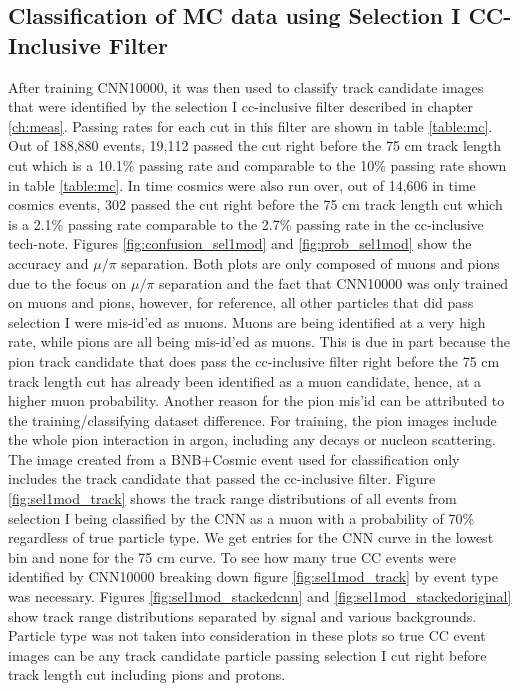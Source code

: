 \subsection{Classification of MC data using Selection I CC-Inclusive Filter}

After training CNN10000, it was then used to classify track candidate images that were identified by the selection I cc-inclusive filter described in chapter \ref{ch:meas}. Passing rates for each cut in this filter are shown in table \ref{table:mc}. Out of 188,880 events, 19,112 passed the cut right before the 75 cm track length cut which is a 10.1\% passing rate and comparable to the 10\% passing rate shown in table \ref{table:mc}. In time cosmics were also run over, out of 14,606 in time cosmics events, 302 passed the cut right before the 75 cm track length cut which is a 2.1\% passing rate comparable to the 2.7\% passing rate in the cc-inclusive tech-note. Figures \ref{fig:confusion_sel1mod} and \ref{fig:prob_sel1mod} show the accuracy and $\mu/\pi$ separation. Both plots are only composed of muons and pions due to the focus on $\mu/\pi$ separation and the fact that CNN10000 was only trained on muons and pions, however, for reference, all other particles that did pass selection I were mis-id'ed as muons. Muons are being identified at a very high rate, while pions are all being mis-id'ed as muons. This is due in part because the pion track candidate that does pass the cc-inclusive filter right before the 75 cm track length cut has already been identified as a muon candidate, hence, at a higher muon probability. Another reason for the pion mis'id can be attributed to the training/classifying dataset difference. For training, the pion images include the whole pion interaction in argon, including any decays or nucleon scattering. The image created from a BNB+Cosmic event used for classification only includes the track candidate that passed the cc-inclusive filter.
Figure \ref{fig:sel1mod_track} shows the track range distributions of all events from selection I being classified by the CNN as a muon with a probability of 70\% regardless of true particle type. We get entries for the CNN curve in the lowest bin and none for the 75 cm curve. To see how many true CC events were identified by CNN10000 breaking down figure \ref{fig:sel1mod_track} by event type was necessary. Figures \ref{fig:sel1mod_stackedcnn} and \ref{fig:sel1mod_stackedoriginal} show track range distributions separated by signal and various backgrounds. Particle type was not taken into consideration in these plots so true CC event images can be any track candidate particle passing selection I cut right before track length cut including pions and protons. 

